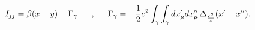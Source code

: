 \begin{equation}
I_{jj}=\beta(x-y)- \Gamma_\gamma \makebox[.5in]{,}\Gamma_\gamma=-\frac{1}{2}e^2\int_\gamma \int_\gamma dx'_\mu dx''_\mu\, \Delta_{\frac{e^2}{\pi}}(x'-x'').
\label{jj}
\end{equation}

